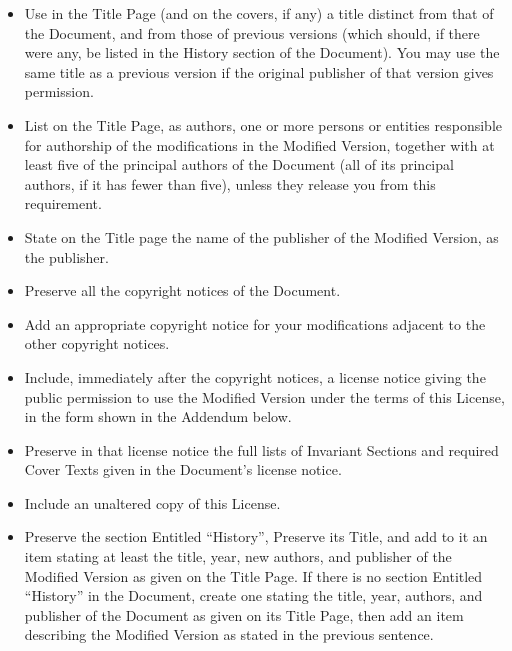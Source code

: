\begin{itemize}
\item[A.] 
   Use in the Title Page (and on the covers, if any) a title distinct
   from that of the Document, and from those of previous versions
   (which should, if there were any, be listed in the History section
   of the Document).  You may use the same title as a previous version
   if the original publisher of that version gives permission.
   
\item[B.]
   List on the Title Page, as authors, one or more persons or entities
   responsible for authorship of the modifications in the Modified
   Version, together with at least five of the principal authors of the
   Document (all of its principal authors, if it has fewer than five),
   unless they release you from this requirement.
   
\item[C.]
   State on the Title page the name of the publisher of the
   Modified Version, as the publisher.
   
\item[D.]
   Preserve all the copyright notices of the Document.
   
\item[E.]
   Add an appropriate copyright notice for your modifications
   adjacent to the other copyright notices.
   
\item[F.]
   Include, immediately after the copyright notices, a license notice
   giving the public permission to use the Modified Version under the
   terms of this License, in the form shown in the Addendum below.
   
\item[G.]
   Preserve in that license notice the full lists of Invariant Sections
   and required Cover Texts given in the Document's license notice.
   
\item[H.]
   Include an unaltered copy of this License.
   
\item[I.]
   Preserve the section Entitled ``History'', Preserve its Title, and add
   to it an item stating at least the title, year, new authors, and
   publisher of the Modified Version as given on the Title Page.  If
   there is no section Entitled ``History'' in the Document, create one
   stating the title, year, authors, and publisher of the Document as
   given on its Title Page, then add an item describing the Modified
   Version as stated in the previous sentence.
   

\end{itemize}
